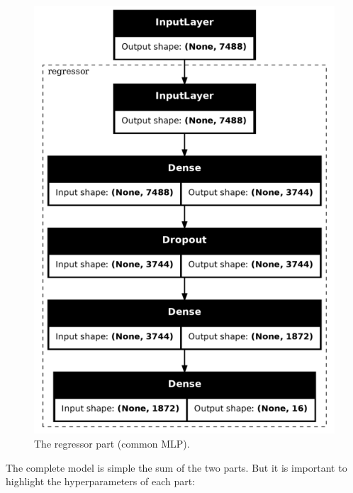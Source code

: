 \documentclass[sigconf,natbib=false]{acmart}
\begin{document}
\begin{figure}[h]
 \centering
 \includegraphics[width=0.8\linewidth]{figs/regressao.png}
 \caption{The regressor part (common MLP).}
\end{figure}

The complete model is simple the sum of the two parts. But it is important to highlight the hyperparameters of each part:
\end{document}
